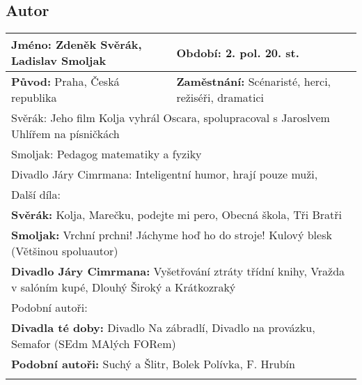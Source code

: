 \subsection*{Autor}
\begin{tabularx}{\linewidth}{l|l}
  \textbf{Jméno:} Zdeněk Svěrák, Ladislav Smoljak & \textbf{Období:} 2. pol. 20. st.                                                      \\
  \hline
  \textbf{Původ:} Praha, Česká republika          & \textbf{Zaměstnání:} Scénaristé, herci, režiséři, dramatici                           \\
  \hline
  \multicolumn{2}{l}{Svěrák: Jeho film Kolja vyhrál Oscara, spolupracoval s Jaroslvem Uhlířem na písničkách}                              \\
  \multicolumn{2}{l}{Smoljak: Pedagog matematiky a fyziky}                                                                                \\
  \multicolumn{2}{l}{Divadlo Járy Cimrmana: Inteligentní humor, hrají pouze muži, }                                                       \\
  \hline
  \multicolumn{2}{l}{Další díla:}                                                                                                         \\
  \multicolumn{2}{l}{\textbf{Svěrák:} Kolja, Marečku, podejte mi pero, Obecná škola, Tři Bratři}                                          \\
  \multicolumn{2}{l}{\textbf{Smoljak:} Vrchní prchni! Jáchyme hoď ho do stroje! Kulový blesk (Většinou spoluautor)}                       \\
  \multicolumn{2}{l}{\textbf{Divadlo Járy Cimrmana:} Vyšetřování ztráty třídní knihy, Vražda v salóním kupé, Dlouhý Široký a Krátkozraký} \\
  \hline
  \multicolumn{2}{l}{Podobní autoři:}                                                                                                     \\
  \multicolumn{2}{l}{\textbf{Divadla té doby:} Divadlo Na zábradlí, Divadlo na provázku, Semafor (SEdm MAlých FORem)}                     \\
  \multicolumn{2}{l}{\textbf{Podobní autoři:} Suchý a Šlitr, Bolek Polívka, F. Hrubín}                                                    \\                                                               \\
\end{tabularx}
